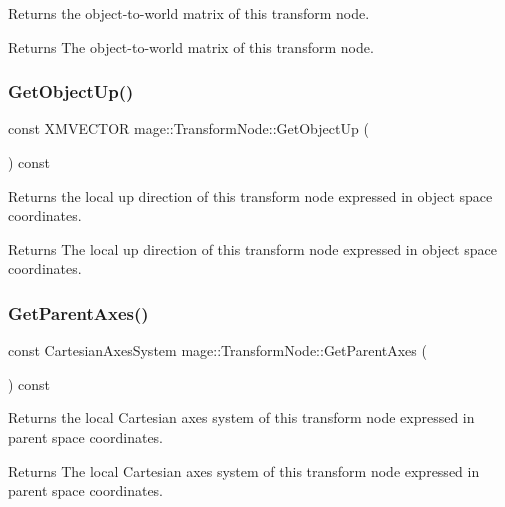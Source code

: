 Returns the object-\/to-\/world matrix of this transform node.

\begin{DoxyReturn}{Returns}
The object-\/to-\/world matrix of this transform node. 
\end{DoxyReturn}
\hypertarget{classmage_1_1_transform_node_a4d209a7f35df862836c5e2f1badfd968}{}\label{classmage_1_1_transform_node_a4d209a7f35df862836c5e2f1badfd968} 
\subsubsection{\texorpdfstring{Get\+Object\+Up()}{GetObjectUp()}}
{\footnotesize\ttfamily const X\+M\+V\+E\+C\+T\+OR mage\+::\+Transform\+Node\+::\+Get\+Object\+Up (\begin{DoxyParamCaption}{ }\end{DoxyParamCaption}) const}

Returns the local up direction of this transform node expressed in object space coordinates.

\begin{DoxyReturn}{Returns}
The local up direction of this transform node expressed in object space coordinates. 
\end{DoxyReturn}
\hypertarget{classmage_1_1_transform_node_aac33c894481ee82a5a0af2a4aeb2b9f8}{}\label{classmage_1_1_transform_node_aac33c894481ee82a5a0af2a4aeb2b9f8} 
\subsubsection{\texorpdfstring{Get\+Parent\+Axes()}{GetParentAxes()}}
{\footnotesize\ttfamily const Cartesian\+Axes\+System mage\+::\+Transform\+Node\+::\+Get\+Parent\+Axes (\begin{DoxyParamCaption}{ }\end{DoxyParamCaption}) const}

Returns the local Cartesian axes system of this transform node expressed in parent space coordinates.

\begin{DoxyReturn}{Returns}
The local Cartesian axes system of this transform node expressed in parent space coordinates. 
\end{DoxyReturn}
\hypertarget{classmage_1_1_transform_node_a64aae2ae63bc53791d3febed5a51f989}{}\label{classmage_1_1_transform_node_a64aae2ae63bc53791d3febed5a51f989} 
